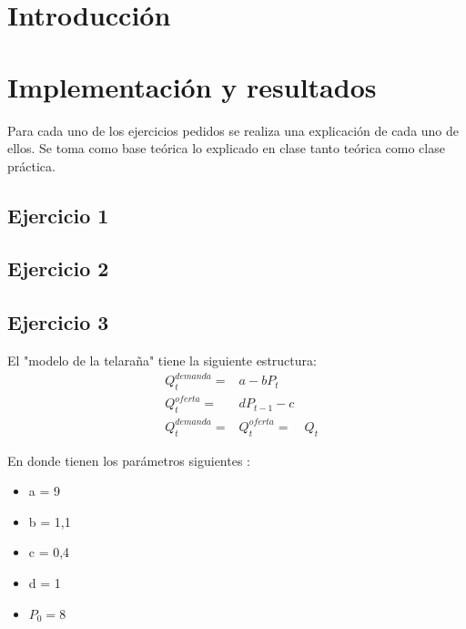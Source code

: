 \documentclass[11pt,a4paper]{article}
\begin{document}
\newpage

\section{Introducción}


\section{Implementación y resultados}
Para cada uno de los ejercicios pedidos se realiza una explicación de cada uno de ellos. Se toma como base teórica lo explicado en clase tanto teórica como clase práctica.

	\subsection{Ejercicio 1}
	    

	\subsection{Ejercicio 2}
	    
		
	\subsection{Ejercicio 3}
		El "modelo de la telaraña" tiene la siguiente estructura:
		\begin{equation}
			\begin{array}{llllll}
				&Q_t^{demanda} = & a - bP_t \\
				&Q_t^{oferta} = & dP_{t-1} - c \\
				&Q_t^{demanda} = &Q_t^{oferta}  = &Q_t
			\end{array}
		\end{equation}
		
		En donde tienen los parámetros siguientes :
		\begin{itemize}
					\item a = 9
					\item b = 1,1
					\item c = 0,4
					\item d = 1
					\item $P_0 = 8$
		\end{itemize}
\end{document}
